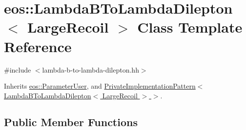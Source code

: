\hypertarget{classeos_1_1LambdaBToLambdaDilepton_3_01LargeRecoil_01_4}{
\section{eos::LambdaBToLambdaDilepton$<$ LargeRecoil $>$ Class Template Reference}
\label{classeos_1_1LambdaBToLambdaDilepton_3_01LargeRecoil_01_4}
}


{\ttfamily \#include $<$lambda-\/b-\/to-\/lambda-\/dilepton.hh$>$}

Inherits \hyperlink{classeos_1_1ParameterUser}{eos::ParameterUser}, and \hyperlink{classeos_1_1PrivateImplementationPattern}{PrivateImplementationPattern$<$ LambdaBToLambdaDilepton$<$ LargeRecoil $>$ $>$}.\subsection*{Public Member Functions}
